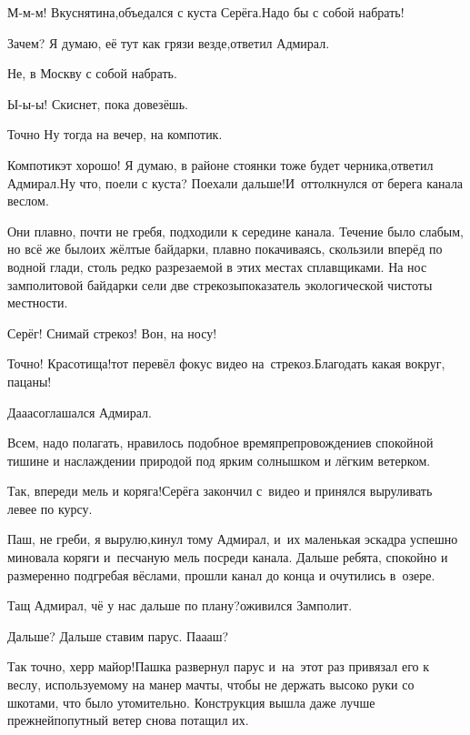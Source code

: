 \diagdash М-м-м! Вкуснятина,\mdash объедался с куста Серёга.\mdash Надо бы с собой набрать!

\diagdash Зачем? Я думаю, её тут как грязи везде,\mdash ответил Адмирал.

\diagdash Не, в Москву с собой набрать.

\diagdash Ы-ы-ы! Скиснет, пока довезёшь.

\diagdash Точно\myldots{} Ну тогда на вечер, на компотик.

\diagdash Компотик\mdash эт хорошо! Я думаю, в районе стоянки тоже будет черника,\mdash ответил Адмирал.\mdash Ну что, поели с куста? Поехали дальше!\mdash И~оттолкнулся от берега канала веслом.

Они плавно, почти не гребя, подходили к середине канала. Течение было слабым, но всё же было\mdash их жёлтые байдарки, плавно покачиваясь, скользили вперёд по водной глади, столь редко разрезаемой в этих местах сплавщиками. На нос замполитовой байдарки сели две стрекозы\mdash показатель экологической чистоты местности.

\diagdash Серёг! Снимай стрекоз! Вон, на носу!

\diagdash Точно! Красотища!\mdash тот перевёл фокус видео на~стрекоз.\mdash Благодать какая вокруг, пацаны!

\diagdash Да\sdash а\sdash а\myldots{}\mdash соглашался Адмирал.

Всем, надо полагать, нравилось подобное времяпрепровождение\mdash в спокойной тишине и наслаждении природой под ярким солнышком и лёгким ветерком. 

\diagdash Так, впереди мель и коряга!\mdash Серёга закончил с~видео и принялся выруливать левее по курсу. 

\diagdash Паш, не греби, я вырулю,\mdash кинул тому Адмирал, и~их маленькая эскадра успешно миновала коряги и~песчаную мель посреди канала. Дальше ребята, спокойно и размеренно подгребая вёслами, прошли канал до конца и очутились в~озере.%

\diagdash Тащ Адмирал, чё у нас дальше по плану?\mdash оживился Замполит.

\diagdash Дальше? Дальше ставим парус. Па\sdash а\sdash аш?

\diagdash Так точно, херр майор!\mdash Пашка развернул парус и~на~этот раз привязал его к веслу, используемому на манер мачты, чтобы не держать высоко руки со шкотами, что было утомительно. Конструкция вышла даже лучше прежней\mdash попутный ветер снова потащил их. 

